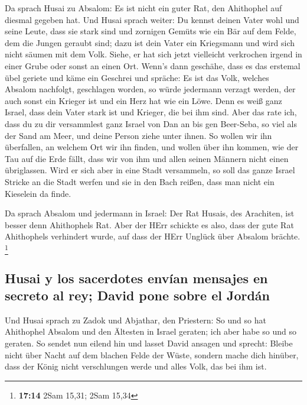  Da sprach Husai zu Absalom: Es ist nicht ein guter Rat,
den Ahithophel auf diesmal gegeben hat.  Und Husai sprach
weiter: Du kennst deinen Vater wohl und seine Leute, dass sie stark sind
und zornigen Gemüts wie ein Bär auf dem Felde, dem die Jungen geraubt
sind; dazu ist dein Vater ein Kriegsmann und wird sich nicht säumen mit
dem Volk.  Siehe, er hat sich jetzt vielleicht verkrochen
irgend in einer Grube oder sonst an einen Ort. Wenn's dann geschähe,
dass es das erstemal übel geriete und käme ein Geschrei und spräche: Es
ist das Volk, welches Absalom nachfolgt, geschlagen worden,
 so würde jedermann verzagt werden, der auch sonst ein
Krieger ist und ein Herz hat wie ein Löwe. Denn es weiß ganz Israel,
dass dein Vater stark ist und Krieger, die bei ihm sind. 
Aber das rate ich, dass du zu dir versammlest ganz Israel von Dan an bis
gen Beer-Seba, so viel als der Sand am Meer, und deine Person ziehe
unter ihnen.  So wollen wir ihn überfallen, an welchem
Ort wir ihn finden, und wollen über ihn kommen, wie der Tau auf die Erde
fällt, dass wir von ihm und allen seinen Männern nicht einen
übriglassen.  Wird er sich aber in eine Stadt versammeln,
so soll das ganze Israel Stricke an die Stadt werfen und sie in den Bach
reißen, dass man nicht ein Kieselein da finde.

 Da sprach Absalom und jedermann in Israel: Der Rat
Husais, des Arachiten, ist besser denn Ahithophels Rat. Aber der HErr
schickte es also, dass der gute Rat Ahithophels verhindert wurde, auf
dass der HErr Unglück über Absalom brächte. \footnote{\textbf{17:14}
  2Sam 15,31; 2Sam 15,34}

\hypertarget{husai-y-los-sacerdotes-envuxedan-mensajes-en-secreto-al-rey-david-pone-sobre-el-jorduxe1n}{%
\subsection{Husai y los sacerdotes envían mensajes en secreto al rey;
David pone sobre el
Jordán}\label{husai-y-los-sacerdotes-envuxedan-mensajes-en-secreto-al-rey-david-pone-sobre-el-jorduxe1n}}

 Und Husai sprach zu Zadok und Abjathar, den Priestern:
So und so hat Ahithophel Absalom und den Ältesten in Israel geraten; ich
aber habe so und so geraten.  So sendet nun eilend hin
und lasset David ansagen und sprecht: Bleibe nicht über Nacht auf dem
blachen Felde der Wüste, sondern mache dich hinüber, dass der König
nicht verschlungen werde und alles Volk, das bei ihm ist.

